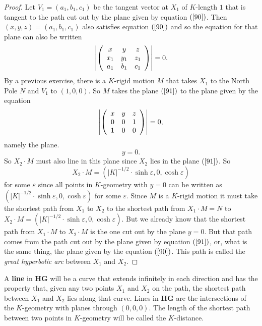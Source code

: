 \documentclass{ximera}
\begin{document}
\begin{proof}
Let $V_{1}=\left(  a_{1},b_{1},c_{1}\right)  $ be the tangent vector at
$X_{1}$ of $K$-length $1$ that is tangent to the path cut out by the plane
given by equation $\left(  \ref{90}\right)  $. Then $\left(  x,y,z\right)
=\left(  a_{1},b_{1},c_{1}\right)  $ also satisfies equation $\left(
\ref{90}\right)  $ and so the equation for that plane can also be written%
\begin{equation}
\left\vert \left(
\begin{array}
[c]{ccc}%
x & y & z\\
x_{1} & y_{1} & z_{1}\\
a_{1} & b_{1} & c_{1}%
\end{array}
\right)  \right\vert =0. \label{91}%
\end{equation}
By a previous exercise, there is a $K$-rigid motion $M$ that takes
$X_{1}$ to the North Pole $N$ and $V_{1}$ to $\left( 1,0,0\right)
$. So $M$ takes the plane $\left( \ref{91}\right) $ to the plane given
by the equation%
\[
\left\vert \left(
\begin{array}
[c]{ccc}%
x & y & z\\
0 & 0 & 1\\
1 & 0 & 0
\end{array}
\right)  \right\vert =0,
\]
namely the plane.%
\[
y=0.
\]
So $X_{2}\cdot M$ must also line in this plane since $X_{2}$ lies in the plane
$\left(  \ref{91}\right)  $. So%
\[
X_{2}\cdot M=\left(  \left\vert K\right\vert ^{-1/2}\cdot\sinh \varepsilon,0,\cosh \varepsilon\right)
\]
for some $\varepsilon$ since all points in $K$-geometry with $y=0$ can
be written as $\left( \left\vert K\right\vert
^{-1/2}\cdot\sinh \varepsilon,0,\cosh \varepsilon\right) $ for some
$\varepsilon$. Since $M$ is a $K$-rigid motion it must take the
shortest path from $X_{1}$ to $X_{2}$ to the shortest path from
$X_{1}\cdot M=N$ to $X_{2}\cdot M=\left( \left\vert K\right\vert
^{-1/2}\cdot \sinh \varepsilon,0,\cosh \varepsilon\right) $. But we
already know that the shortest path from $X_{1}\cdot M$ to $X_{2}\cdot
M$ is the one cut out by the plane $y=0$. But that path comes from the
path cut out by the plane given by equation $\left( \ref{91}\right) $,
or, what is the same thing, the plane given by the equation $\left(
\ref{90}\right) $. This path is called the \textit{great hyperbolic
  arc} between $X_{1}$ and $X_{2}$.
\end{proof}

\begin{definition}
A \textbf{line} in \textbf{HG} will be a curve that extends infinitely
in each direction and has the property that, given any two points
$X_{1}$ and $X_{2}$ on the path, the shortest path between $X_{1}$ and
$X_{2}$ lies along that curve. Lines in \textbf{HG} are the
intersections of the $K$-geometry with planes through $\left(
0,0,0\right) $. The length of the shortest path between two points in
$K$-geometry will be called the $K$-distance.
\end{definition}
\end{document}
